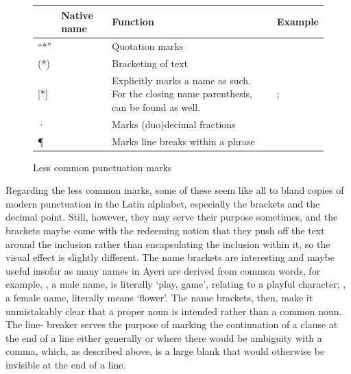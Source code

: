 \begin{figure}[tp]
\caption{Less common punctuation marks}
\begin{tabu} to 
\toprule
\tableheaderfont

	& Native name
	& Function
	& Example
	\\
	
\toprule

“*”
	& 
	& Quotation marks
	& 
	\\
	
\midrule

(*)
	& 
	& Bracketing of text
	& 
	\\

\midrule

[*]
	& 
	& Explicitly marks a name as such. For the closing name parenthesis, 
		 can be found as well.
	& ; 
	\\
	
\midrule

·
	& 
	& Marks (duo)decimal fractions
	& 
	\\
	
\midrule

¶
	& 
	& Marks line breaks within a phrase
	& 
	\\

\bottomrule
\end{tabu}
\label{fig:thpunctuncom}
\end{figure}

Regarding the less common marks, some of these seem like all to bland copies of
modern punctuation in the Latin alphabet, especially the brackets and the
decimal point. Still, however, they may serve their purpose sometimes, and the
brackets \ayr{(*)} maybe come with the redeeming notion that they push off the
text around the inclusion rather than encapsulating the inclusion within it, so
the visual effect is slightly different. The name brackets \ayr{[*]} are
interesting and maybe useful insofar as many names in Ayeri are derived from
common words, for example, , a male name, is literally
`play, game', relating to a playful character; , a female
name, literally means `flower'. The name brackets, then, make it unmistakably
clear that a proper noun is intended rather than a common noun. The line-
breaker  serves the purpose of marking the continuation of a clause at
the end of a line either generally or where there would be ambiguity with a
comma, which, as described above, is a large blank that would otherwise be
invisible at the end of a line.

